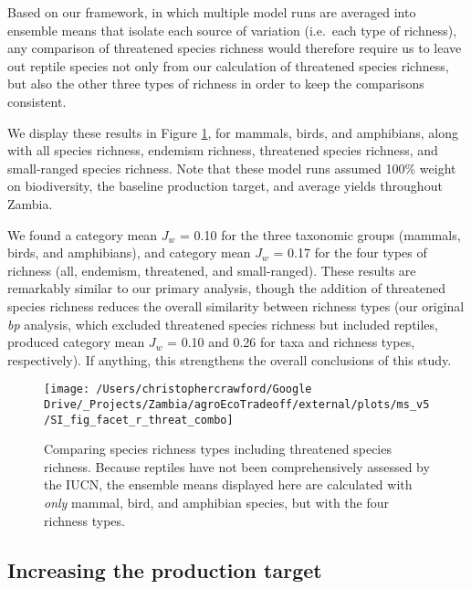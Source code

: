 \documentclass[
]{article}
\begin{document}
Based on our framework, in which multiple model runs are averaged into ensemble means that isolate each source of variation (i.e.~each type of richness), any comparison of threatened species richness would therefore require us to leave out reptile species not only from our calculation of threatened species richness, but also the other three types of richness in order to keep the comparisons consistent.

We display these results in Figure \ref{fig:threat-richness}, for mammals, birds, and amphibians, along with all species richness, endemism richness, threatened species richness, and small-ranged species richness. Note that these model runs assumed 100\% weight on biodiversity, the baseline production target, and average yields throughout Zambia.

We found a category mean \(J_w\) = 0.10 for the three taxonomic groups (mammals, birds, and amphibians), and category mean \(J_w\) = 0.17 for the four types of richness (all, endemism, threatened, and small-ranged). These results are remarkably similar to our primary analysis, though the addition of threatened species richness reduces the overall similarity between richness types (our original \emph{bp} analysis, which excluded threatened species richness but included reptiles, produced category mean \(J_w\) = 0.10 and 0.26 for taxa and richness types, respectively). If anything, this strengthens the overall conclusions of this study.



\begin{figure}

{\centering \texttt{[image: /Users/christophercrawford/Google Drive/\_Projects/Zambia/agroEcoTradeoff/external/plots/ms\_v5/SI\_fig\_facet\_r\_threat\_combo]} 

}

\caption{Comparing species richness types including threatened species richness. Because reptiles have not been comprehensively assessed by the IUCN, the ensemble means displayed here are calculated with \emph{only} mammal, bird, and amphibian species, but with the four richness types.}\label{fig:threat-richness}
\end{figure}

\newpage

\hypertarget{section-prod-targ}{%
\subsection{Increasing the production target}\label{section-prod-targ}}
\end{document}
